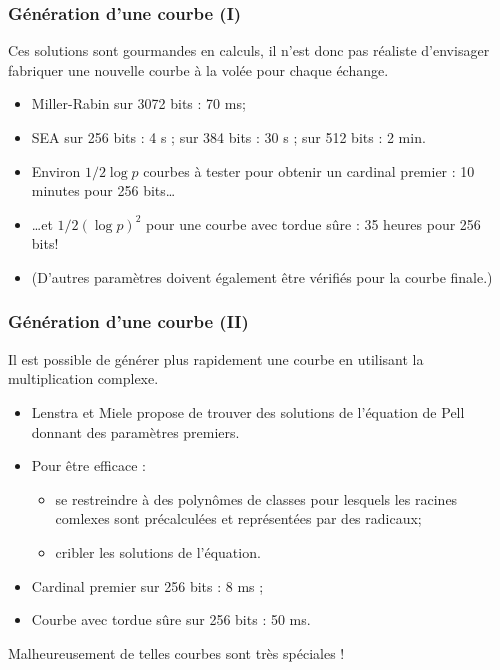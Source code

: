 \documentclass[francais]{beamer}
\begin{document}
\begin{frame}\frametitle{Génération d'une courbe (I)}
\begin{block}{}
Ces solutions sont gourmandes en calculs,
il n'est donc pas réaliste d'envisager
fabriquer une nouvelle courbe à la volée pour chaque échange.
\end{block}

\begin{itemize}
\item Miller-Rabin sur 3072 bits : 70 ms;
\item SEA sur 256 bits : 4 s ; sur 384 bits : 30 s ; sur 512 bits : 2 min.
\item Environ $1/2 \log p$ courbes à tester pour obtenir un cardinal premier : 10 minutes pour 256 bits\ldots
\item \ldots et $1/2 (\log p)^2$ pour une courbe avec tordue sûre : 35 heures pour 256 bits!
\item (D'autres paramètres doivent également être vérifiés pour la courbe finale.)
\end{itemize}
\end{frame}

\begin{frame}\frametitle{Génération d'une courbe (II)}
\begin{block}{}
Il est possible de générer plus rapidement une courbe en utilisant la multiplication complexe.
\end{block}

\begin{itemize}
\item Lenstra et Miele propose de trouver des solutions de l'équation de Pell donnant des paramètres premiers.
\item Pour être efficace :
\begin{itemize}
\item se restreindre à des polynômes de classes pour lesquels les racines comlexes sont précalculées et représentées par des radicaux;
\item cribler les solutions de l'équation.
\end{itemize}
\end{itemize}
\begin{block}{}
\begin{itemize}
\item Cardinal premier sur 256 bits : 8 ms ;
\item Courbe avec tordue sûre sur 256 bits : 50 ms.
\end{itemize}
\end{block}
Malheureusement de telles courbes sont très spéciales !
\end{frame}
\end{document}
